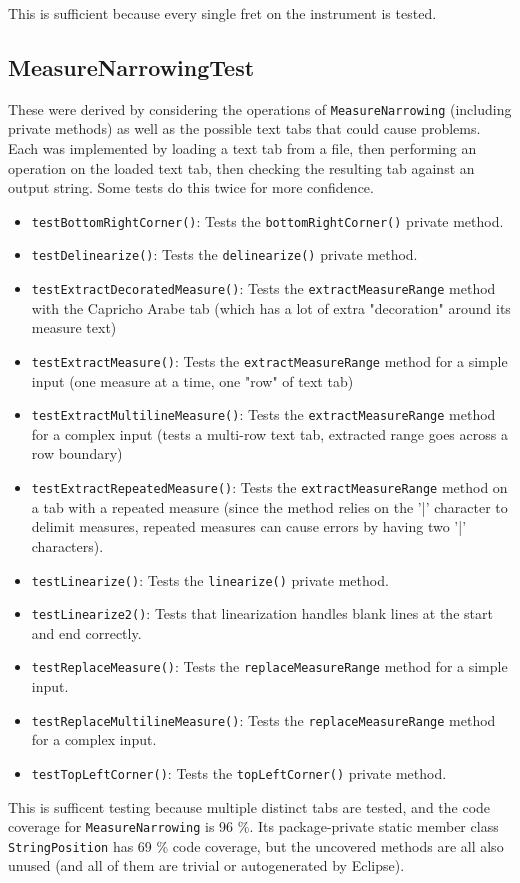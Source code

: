 \documentclass[11pt]{article}
\begin{document}
This is sufficient because every single fret on the instrument is tested.

\subsection{MeasureNarrowingTest}
\label{sec:orgb368de7}
These were derived by considering the operations of \texttt{MeasureNarrowing} (including private methods) as well as the possible text tabs that could cause problems.
Each was implemented by loading a text tab from a file, then performing an operation on the loaded text tab, then checking the resulting tab against an output string.  Some tests do this twice for more confidence.

\begin{itemize}
\item \texttt{testBottomRightCorner()}: Tests the \texttt{bottomRightCorner()} private method.
\item \texttt{testDelinearize()}: Tests the \texttt{delinearize()} private method.
\item \texttt{testExtractDecoratedMeasure()}: Tests the \texttt{extractMeasureRange} method with the Capricho Arabe tab (which has a lot of extra "decoration" around its measure text)
\item \texttt{testExtractMeasure()}: Tests the \texttt{extractMeasureRange} method for a simple input (one measure at a time, one "row" of text tab)
\item \texttt{testExtractMultilineMeasure()}: Tests the \texttt{extractMeasureRange} method for a complex input (tests a multi-row text tab, extracted range goes across a row boundary)
\item \texttt{testExtractRepeatedMeasure()}: Tests the \texttt{extractMeasureRange} method on a tab with a repeated measure (since the method relies on the '|' character to delimit measures, repeated measures can cause errors by having two '|' characters).
\item \texttt{testLinearize()}: Tests the \texttt{linearize()} private method.
\item \texttt{testLinearize2()}: Tests that linearization handles blank lines at the start and end correctly.
\item \texttt{testReplaceMeasure()}: Tests the \texttt{replaceMeasureRange} method for a simple input.
\item \texttt{testReplaceMultilineMeasure()}: Tests the \texttt{replaceMeasureRange} method for a complex input.
\item \texttt{testTopLeftCorner()}: Tests the \texttt{topLeftCorner()} private method.
\end{itemize}

This is sufficent testing because multiple distinct tabs are tested, and the code coverage for \texttt{MeasureNarrowing} is 96 \%.  Its package-private static member class \texttt{StringPosition} has 69 \% code coverage, but the uncovered methods are all also unused (and all of them are trivial or autogenerated by Eclipse).
\end{document}
